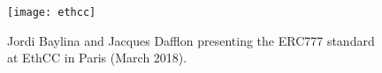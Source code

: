\begin{figure}[!htbp]
\label{fig:ethcc}
\centering
\texttt{[image: ethcc]}
\caption[Presentation of the ERC777 standard at EthCC]{Jordi Baylina and Jacques Dafflon presenting the ERC777 standard at EthCC in Paris (March 2018)\footnotemark.}
\end{figure}

